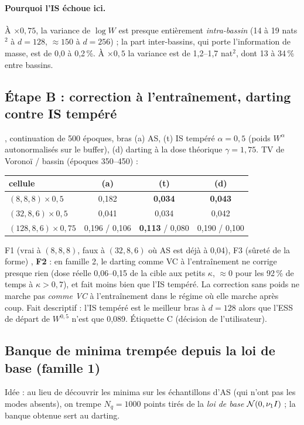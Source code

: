 \paragraph{Pourquoi l'IS échoue ici.} À $\times0{,}75$, la variance de $\log W$ est presque entièrement \emph{intra-bassin} (14 à 19 nats$^2$ à $d=128$, $\approx150$ à $d=256$) ; la part inter-bassins, qui porte l'information de masse, est de 0,0 à 0,2\,\%. À $\times0{,}5$ la variance est de 1,2--1,7 nat$^2$, dont 13 à 34\,\% entre bassins.

\subsection{Étape B : correction à l'entraînement, darting contre IS tempéré}
, continuation de 500 époques, bras (a) AS, (t) IS tempéré $\alpha=0{,}5$ (poids $W^\alpha$ autonormalisés sur le buffer), (d) darting à la dose théorique $\gamma=1{,}75$. TV de Voronoï / bassin (époques 350--450) :
\begin{table}[h]\centering\small
\begin{tabular}{lccc}\toprule
cellule & (a) & (t) & (d)\\\midrule
$(8,8,8)\times0{,}5$ & 0,182 & \textbf{0,034} & \textbf{0,043}\\
$(32,8,6)\times0{,}5$ & 0,041 & 0,034 & 0,042\\
$(128,8,6)\times0{,}75$ & 0,196 / 0,106 & \textbf{0,113} / 0,080 & 0,190 / 0,100\\\bottomrule
\end{tabular}
\end{table}
\begin{verdict}F1 \faux{} (vrai à $(8,8,8)$, faux à $(32,8,6)$ où AS est déjà à 0,04), F3 (sûreté de la forme) \vrai, \textbf{F2 \faux} : en famille 2, le darting comme VC à l'entraînement ne corrige presque rien (dose réelle 0,06--0,15 de la cible aux petits $\kappa$, $\approx0$ pour les 92\,\% de temps à $\kappa>0{,}7$), et fait moins bien que l'IS tempéré. La correction sans poids ne marche pas \emph{comme VC} à l'entraînement dans le régime où elle marche après coup. Fait descriptif : l'IS tempéré est le meilleur bras à $d=128$ alors que l'ESS de départ de $W^{0{,}5}$ n'est que 0,089. Étiquette C (décision de l'utilisateur).\end{verdict}

\subsection{Banque de minima trempée depuis la loi de base (famille 1)}
Idée : au lieu de découvrir les minima sur les échantillons d'AS (qui n'ont pas les modes absents), on trempe $N_q=1000$ points tirés de la \emph{loi de base} $\mathcal{N}(0,\nu_{1} I)$ ; la banque obtenue sert au darting.
